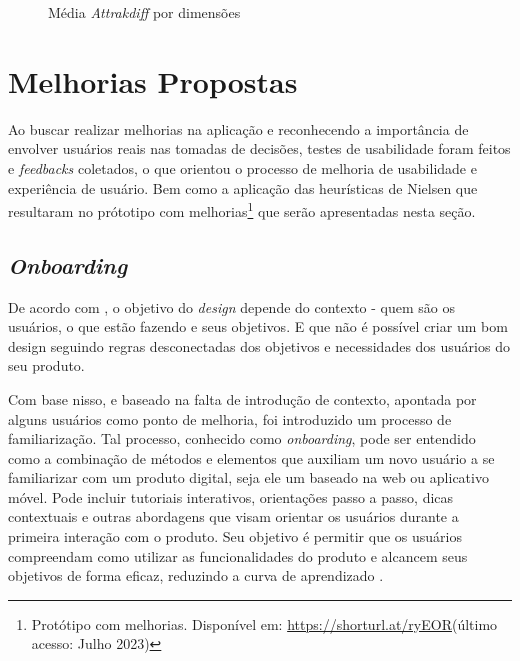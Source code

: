 \begin{figure}[h!]
	\centering
	\caption{Média \textit{Attrakdiff} por dimensões}
	\label{fig21}
\end{figure}

\section{Melhorias Propostas}
\label{sec:Melhorias Propostas}
Ao buscar realizar melhorias na aplicação e reconhecendo a importância de envolver usuários reais nas tomadas de decisões, testes de usabilidade foram feitos e \textit{feedbacks} coletados, 
o que orientou o processo de melhoria de usabilidade e experiência de usuário. Bem como a aplicação das heurísticas de Nielsen que resultaram no prótotipo com melhorias\footnote{Protótipo 
com melhorias. Disponível em: \url{https://shorturl.at/ryEOR}(último acesso: Julho 2023)} que serão apresentadas nesta seção.

\subsection{\textit{Onboarding}}
\label{sec:Onboarding}
De acordo com , o objetivo do \textit{design} depende do contexto - quem são os usuários, o que estão fazendo e seus objetivos. E que não é possível criar um bom design 
seguindo regras desconectadas dos objetivos e necessidades dos usuários do seu produto. 

Com base nisso, e baseado na falta de introdução de contexto, apontada por alguns usuários como ponto de 
melhoria, foi introduzido um processo de familiarização. Tal processo, conhecido como \textit{onboarding}, pode ser entendido como a combinação de métodos e elementos que auxiliam um novo usuário 
a se familiarizar com um produto digital, seja ele um baseado na web ou aplicativo móvel. Pode incluir tutoriais interativos, orientações passo a passo, dicas contextuais e outras abordagens que 
visam orientar os usuários durante a primeira interação com o produto. Seu objetivo é permitir que os usuários compreendam como utilizar as funcionalidades do produto e alcancem seus 
objetivos de forma eficaz, reduzindo a curva de aprendizado \cite{renz2014}.

